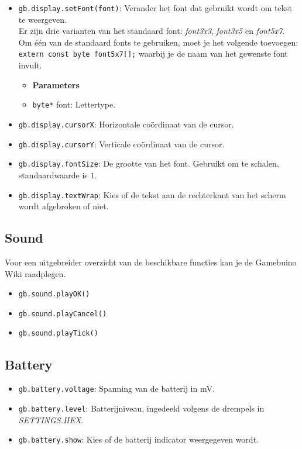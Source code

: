 \documentclass[a4paper,titlepage,12pt]{article}
\begin{document}
	\begin{itemize}
		\item \samepage \texttt{gb.display.setFont(font)}: Verander het font dat gebruikt wordt om tekst te weergeven. \\ Er zijn drie varianten van het standaard font: \emph{font3x3}, \emph{font3x5} en \emph{font5x7}. Om één van de standaard fonts te gebruiken, moet je het volgende toevoegen: \texttt{extern const byte font5x7[];} waarbij je de naam van het gewenste font invult.
		\begin{itemize}
			\item [] \textbf{Parameters}
			\item \texttt{byte*} font: Lettertype.
		\end{itemize}
	
		\item \texttt{gb.display.cursorX}: Horizontale coördinaat van de cursor.
		\item \texttt{gb.display.cursorY}: Verticale coördinaat van de cursor.
		
		\item \texttt{gb.display.fontSize}: De grootte van het font. Gebruikt om te schalen, standaardwaarde is $1$.
		
		\item \texttt{gb.display.textWrap}: Kies of de tekst aan de rechterkant van het scherm wordt afgebroken of niet.
	\end{itemize}

	\subsection{Sound}
	Voor een uitgebreider overzicht van de beschikbare functies kan je de Gamebuino Wiki\cite{Gamebuino:Wiki:Reference} raadplegen.
	\begin{itemize}
		\item \texttt{gb.sound.playOK()}
		\item \texttt{gb.sound.playCancel()}
		\item \texttt{gb.sound.playTick()}
	\end{itemize}

	\subsection{Battery}
	\begin{itemize}
		\item \texttt{gb.battery.voltage}: Spanning van de batterij in mV.
		
		\item \texttt{gb.battery.level}: Batterijniveau, ingedeeld volgens de drempels in \emph{SETTINGS.HEX}.
		
		\item \texttt{gb.battery.show}: Kies of de batterij indicator weergegeven wordt.
	\end{itemize}
\end{document}
